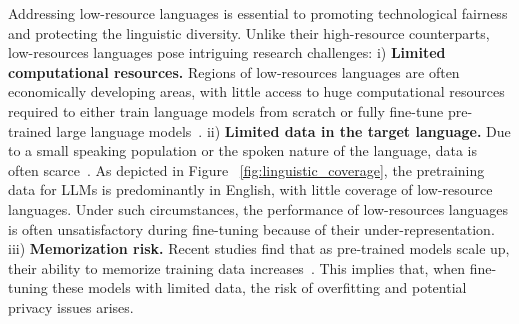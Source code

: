\documentclass[withindex,glossary,firstyr]{cam-thesis}
\begin{document}
Addressing low-resource languages is essential to promoting technological fairness and protecting the linguistic diversity. Unlike their high-resource counterparts, low-resources languages pose intriguing research challenges: 
%
i) \textbf{Limited computational resources.} Regions of low-resources languages are often economically developing areas, with little access to huge computational resources required to either train language models from scratch or fully fine-tune pre-trained large language models~\citep{mager2021findings,adebara-abdul-mageed-2022-towards}.
ii) \textbf{Limited data in the target language.} Due to a small speaking population or the spoken nature of the language, data is often scarce~\cite{adelani2021masakhaner,muhammad2022naijasenti,ebrahimi-etal-2022-americasnli}. As depicted in Figure ~\ref{fig:linguistic_coverage}, the pretraining data for LLMs is predominantly in English, with little coverage of low-resource languages. Under such circumstances, the performance of low-resources languages is often unsatisfactory during fine-tuning because of their under-representation.
iii) \textbf{Memorization risk.} Recent studies find that as pre-trained models scale up, their ability to memorize training data increases~\cite{tirumala2022memorization}. This implies that, when fine-tuning these models with limited data, the risk of overfitting and potential privacy issues arises.
\end{document}
